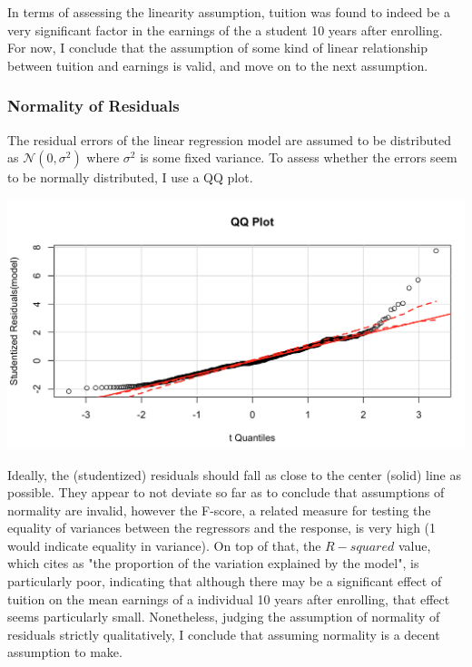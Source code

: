 \documentclass[10pt]{article}
\begin{document}
In terms of assessing the linearity assumption, tuition was found to indeed be a very significant factor in the earnings of the a student 10 years after enrolling. For now, I conclude that the assumption of some kind of linear relationship between tuition and earnings is valid, and move on to the next assumption. 

\subsubsection{Normality of Residuals}
The residual errors of the linear regression model are assumed to be distributed as $\mathcal{N}(0, \sigma^2)$ where $\sigma^2$ is some fixed variance. To assess whether the errors seem to be normally distributed, I use a QQ plot. 

\includegraphics[width=\textwidth]{figures/qq_plot}

Ideally, the (studentized) residuals should fall as close to the center (solid) line as possible. They appear to not deviate so far as to conclude that assumptions of normality are invalid, however the F-score, a related measure for testing the equality of variances between the regressors and the response, is very high (1 would indicate equality in variance). On top of that, the $R-squared$ value, which \cite{walpole1993probability} cites as "the proportion of the variation explained by the model", is particularly poor, indicating that although there may be a significant effect of tuition on the mean earnings of a individual 10 years after enrolling, that effect seems particularly small. Nonetheless, judging the assumption of normality of residuals strictly qualitatively, I conclude that assuming normality is a decent assumption to make. 
\end{document}

